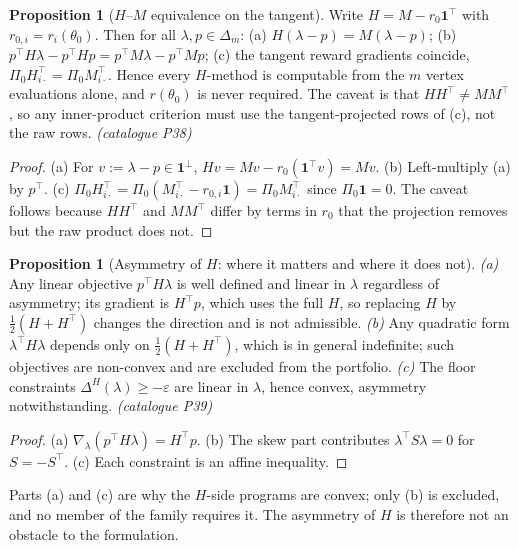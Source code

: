\documentclass[12pt,a4paper]{report}
\newcommand{\1}{\mathbf{1}}
\newcommand{\Pz}{\Pi_{0}}
\theoremstyle{definition}
\newtheorem{proposition}[definition]{Proposition}
\begin{document}
\begin{proposition}[\(H\)--\(M\) equivalence on the tangent]
\label{prop:h-m-equivalence}
Write \(H=M-r_0\1^\top\) with \(r_{0,i}=r_i(\theta_0)\). Then for all \(\lambda,p\in\Delta_m\): (a) \(H(\lambda-p)=M(\lambda-p)\); (b) \(p^\top H\lambda-p^\top Hp=p^\top M\lambda-p^\top Mp\); (c) the tangent reward gradients coincide, \(\Pz H_{i\cdot}^\top=\Pz M_{i\cdot}^\top\). Hence every \(H\)-method is computable from the \(m\) vertex evaluations alone, and \(r(\theta_0)\) is never required. The caveat is that \(HH^\top\ne MM^\top\), so any inner-product criterion must use the tangent-projected rows of (c), not the raw rows. \emph{(catalogue P38)}
\end{proposition}

\begin{proof}
(a) For \(v:=\lambda-p\in\1^\perp\), \(Hv=Mv-r_0(\1^\top v)=Mv\). (b) Left-multiply (a) by \(p^\top\). (c) \(\Pz H_{i\cdot}^\top=\Pz(M_{i\cdot}^\top-r_{0,i}\1)=\Pz M_{i\cdot}^\top\) since \(\Pz\1=0\). The caveat follows because \(HH^\top\) and \(MM^\top\) differ by terms in \(r_0\) that the projection removes but the raw product does not.
\end{proof}

\begin{proposition}[Asymmetry of \(H\): where it matters and where it does not]
\label{prop:h-asymmetry}
\emph{(a)} Any linear objective \(p^\top H\lambda\) is well defined and linear in \(\lambda\) regardless of asymmetry; its gradient is \(H^\top p\), which uses the full \(H\), so replacing \(H\) by \(\tfrac12(H+H^\top)\) changes the direction and is not admissible. \emph{(b)} Any quadratic form \(\lambda^\top H\lambda\) depends only on \(\tfrac12(H+H^\top)\), which is in general indefinite; such objectives are non-convex and are excluded from the portfolio. \emph{(c)} The floor constraints \(\Delta^H(\lambda)\ge-\varepsilon\) are linear in \(\lambda\), hence convex, asymmetry notwithstanding. \emph{(catalogue P39)}
\end{proposition}

\begin{proof}
(a) \(\nabla_\lambda(p^\top H\lambda)=H^\top p\). (b) The skew part contributes \(\lambda^\top S\lambda=0\) for \(S=-S^\top\). (c) Each constraint is an affine inequality.
\end{proof}

Parts (a) and (c) are why the \(H\)-side programs are convex; only (b) is excluded, and no member of the family requires it. The asymmetry of \(H\) is therefore not an obstacle to the formulation.
\end{document}
